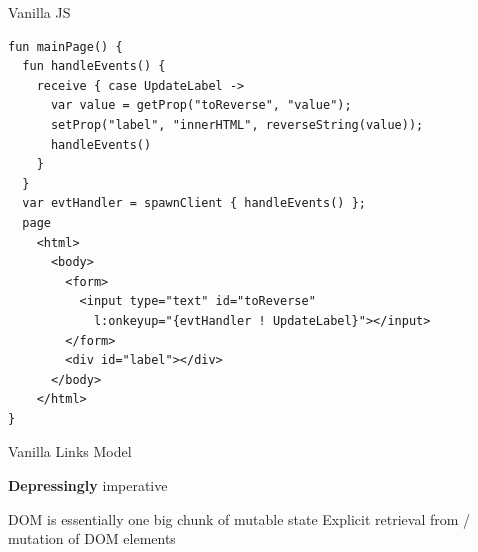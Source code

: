 \documentclass[11.5pt, aspectratio=169]{beamer}
\begin{document}
\begin{frame}[fragile]{Vanilla JS}
  \begin{lstlisting}[language=links]
fun mainPage() {
  fun handleEvents() {
    receive { case UpdateLabel ->
      var value = getProp("toReverse", "value");
      setProp("label", "innerHTML", reverseString(value));
      handleEvents()
    }
  }
  var evtHandler = spawnClient { handleEvents() };
  page
    <html>
      <body>
        <form>
          <input type="text" id="toReverse"
            l:onkeyup="{evtHandler ! UpdateLabel}"></input>
        </form>
        <div id="label"></div>
      </body>
    </html>
}
  \end{lstlisting}
\end{frame}

\begin{frame}{Vanilla Links Model}

  \begin{center}
  \end{center}

  \begin{fullpageitemize}
  \itemR \textbf{Depressingly} imperative
    \begin{itemize}
  \itemR DOM is essentially one big chunk of mutable state
  \itemR Explicit retrieval from / mutation of DOM elements
  \end{itemize}
  \end{fullpageitemize}
\end{frame}


\end{document}
